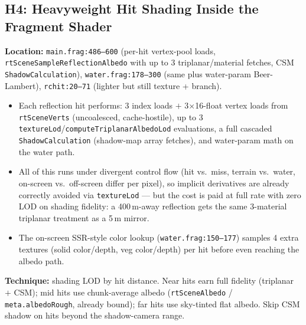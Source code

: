 \documentclass[11pt,a4paper]{article}
\begin{document}
\subsection{H4: Heavyweight Hit Shading Inside the Fragment Shader}

\textbf{Location:} \texttt{main.frag:486--600} (per-hit vertex-pool loads, \texttt{rtSceneSampleReflectionAlbedo} with up to 3 triplanar/material fetches, CSM \texttt{ShadowCalculation}), \texttt{water.frag:178--300} (same plus water-param Beer-Lambert), \texttt{rchit:20--71} (lighter but still texture + branch).

\begin{itemize}
    \item Each reflection hit performs: 3 index loads $+$ 3$\times$16-float vertex loads from \texttt{rtSceneVerts} (uncoalesced, cache-hostile), up to 3 \texttt{textureLod}/\texttt{computeTriplanarAlbedoLod} evaluations, a full cascaded \texttt{ShadowCalculation} (shadow-map array fetches), and water-param math on the water path.
    \item All of this runs under divergent control flow (hit vs.\ miss, terrain vs.\ water, on-screen vs.\ off-screen differ per pixel), so implicit derivatives are already correctly avoided via \texttt{textureLod} --- but the cost is paid at full rate with zero LOD on shading fidelity: a 400\,m-away reflection gets the same 3-material triplanar treatment as a 5\,m mirror.
    \item The on-screen SSR-style color lookup (\texttt{water.frag:150--177}) samples 4 extra textures (solid color/depth, veg color/depth) per hit before even reaching the albedo path.
\end{itemize}

\textbf{Technique:} shading LOD by hit distance. Near hits earn full fidelity (triplanar $+$ CSM); mid hits use chunk-average albedo (\texttt{rtSceneAlbedo} / \texttt{meta.albedoRough}, already bound); far hits use sky-tinted flat albedo. Skip CSM shadow on hits beyond the shadow-camera range.
\end{document}
